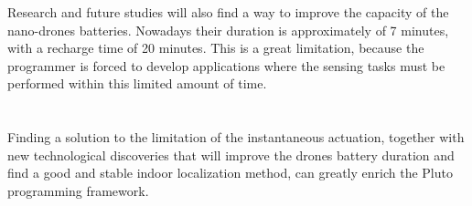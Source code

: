 Research and future studies will also find a way to improve the capacity of the nano-drones batteries. 
Nowadays their duration is approximately of 7 minutes, with a recharge time of 20 minutes.
This is a great limitation, because the programmer is forced to develop applications where the sensing tasks must be performed within this limited amount of time.
\\
\\
\\

Finding a solution to the limitation of the instantaneous actuation, together with new technological discoveries that will improve the drones battery duration and find a good and stable indoor localization method, can greatly enrich the Pluto programming framework.
\\

